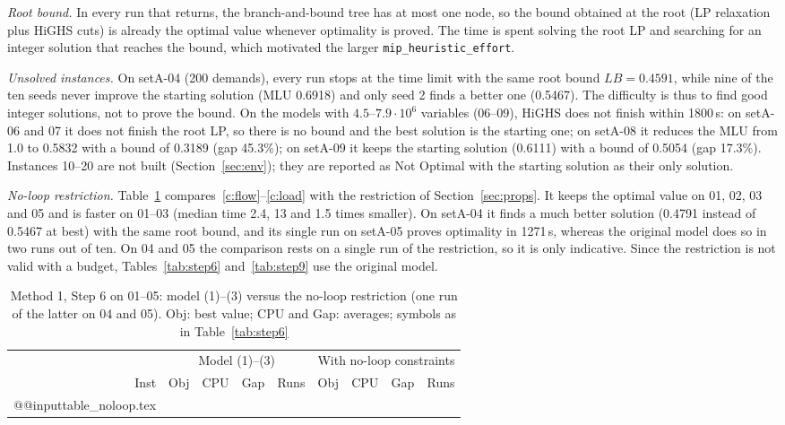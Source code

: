 \documentclass[conference]{IEEEtran}
\begin{document}
\emph{Root bound.} In every run that returns, the branch-and-bound tree has at most one node, so the bound obtained at the root (LP relaxation plus HiGHS cuts) is already the optimal value whenever optimality is proved. The time is spent solving the root LP and searching for an integer solution that reaches the bound, which motivated the larger \texttt{mip\_heuristic\_effort}.

\emph{Unsolved instances.} On setA-04 (200 demands), every run stops at the time limit with the same root bound $LB=0.4591$, while nine of the ten seeds never improve the starting solution (MLU 0.6918) and only seed 2 finds a better one (0.5467). The difficulty is thus to find good integer solutions, not to prove the bound. On the models with $4.5$--$7.9\cdot10^6$ variables (06--09), HiGHS does not finish within 1800\,s: on setA-06 and 07 it does not finish the root LP, so there is no bound and the best solution is the starting one; on setA-08 it reduces the MLU from 1.0 to 0.5832 with a bound of 0.3189 (gap 45.3\%); on setA-09 it keeps the starting solution (0.6111) with a bound of 0.5054 (gap 17.3\%). Instances 10--20 are not built (Section~\ref{sec:env}); they are reported as Not Optimal with the starting solution as their only solution.

\emph{No-loop restriction.} Table~\ref{tab:noloop} compares~\eqref{c:flow}--\eqref{c:load} with the restriction of Section~\ref{sec:props}. It keeps the optimal value on 01, 02, 03 and 05 and is faster on 01--03 (median time 2.4, 13 and 1.5 times smaller). On setA-04 it finds a much better solution (0.4791 instead of 0.5467 at best) with the same root bound, and its single run on setA-05 proves optimality in 1271\,s, whereas the original model does so in two runs out of ten. On 04 and 05 the comparison rests on a single run of the restriction, so it is only indicative. Since the restriction is not valid with a budget, Tables~\ref{tab:step6} and~\ref{tab:step9} use the original model.

\begin{table}[t]
\centering\footnotesize
\caption{Method 1, Step 6 on 01--05: model (1)--(3) versus the no-loop restriction (one run of the latter on 04 and 05). Obj: best value; CPU and Gap: averages; symbols as in Table~\ref{tab:step6}}\label{tab:noloop}
\setlength{\tabcolsep}{2.8pt}
\begin{tabular}{@{}r|rrrr|rrrr@{}}
\toprule
 & \multicolumn{4}{c|}{Model (1)--(3)} & \multicolumn{4}{c}{With no-loop constraints}\\
Inst & Obj & CPU & Gap & Runs & Obj & CPU & Gap & Runs\\
\midrule
\csname @@input\endcsname table_noloop.tex
\bottomrule
\end{tabular}
\end{table}
\end{document}
